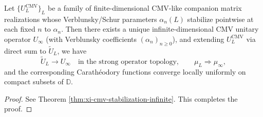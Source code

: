 \begin{theorem}[Pointwise stabilization of finite CMV certificates \texorpdfstring{$\Rightarrow$}{=>} infinite-dimensional CMV unitary spectral realization]\label{thm:discussion-cmv-stabilization-core}
Let \(\{U_L^{\mathrm{CMV}}\}_L\) be a family of finite-dimensional CMV-like companion matrix realizations whose Verblunsky/Schur parameters \(\alpha_n(L)\) stabilize pointwise at each fixed \(n\) to \(\alpha_n\).
Then there exists a unique infinite-dimensional CMV unitary operator \(U_\infty\) (with Verblunsky coefficients \((\alpha_n)_{n\ge 0}\)), and extending \(U_L^{\mathrm{CMV}}\) via direct sum to \(\widetilde U_L\), we have
\[
\widetilde U_L\to U_\infty\quad\text{in the strong operator topology},
\qquad
\mu_L\Rightarrow \mu_\infty,
\]
and the corresponding Carath\'eodory functions converge locally uniformly on compact subsets of \(\mathbb{D}\).
\end{theorem}

\begin{proof}
See Theorem \ref{thm:xi-cmv-stabilization-infinite}. This completes the proof.
\end{proof}

